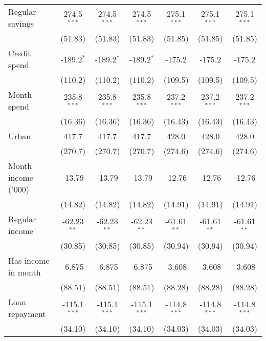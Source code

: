 \begin{table}[htbp]
\begin{footnotesize}
\begin{tabular}{lcccccc}
         Regular savings     & 274.5$^{***}$  & 274.5$^{***}$  & 274.5$^{***}$  & 275.1$^{***}$  & 275.1$^{***}$  & 275.1$^{***}$\\
                             & (51.83)        & (51.83)        & (51.83)        & (51.85)        & (51.85)        & (51.85)\\
         Credit spend        & -189.2$^{*}$   & -189.2$^{*}$   & -189.2$^{*}$   & -175.2         & -175.2         & -175.2\\
                             & (110.2)        & (110.2)        & (110.2)        & (109.5)        & (109.5)        & (109.5)\\
         Month spend         & 235.8$^{***}$  & 235.8$^{***}$  & 235.8$^{***}$  & 237.2$^{***}$  & 237.2$^{***}$  & 237.2$^{***}$\\
                             & (16.36)        & (16.36)        & (16.36)        & (16.43)        & (16.43)        & (16.43)\\
         Urban               & 417.7          & 417.7          & 417.7          & 428.0          & 428.0          & 428.0\\
                             & (270.7)        & (270.7)        & (270.7)        & (274.6)        & (274.6)        & (274.6)\\
         Month income ('000) & -13.79         & -13.79         & -13.79         & -12.76         & -12.76         & -12.76\\
                             & (14.82)        & (14.82)        & (14.82)        & (14.91)        & (14.91)        & (14.91)\\
         Regular income      & -62.23$^{**}$  & -62.23$^{**}$  & -62.23$^{**}$  & -61.61$^{**}$  & -61.61$^{**}$  & -61.61$^{**}$\\
                             & (30.85)        & (30.85)        & (30.85)        & (30.94)        & (30.94)        & (30.94)\\
         Has income in month & -6.875         & -6.875         & -6.875         & -3.608         & -3.608         & -3.608\\
                             & (88.51)        & (88.51)        & (88.51)        & (88.28)        & (88.28)        & (88.28)\\
         Loan repayment      & -115.1$^{***}$ & -115.1$^{***}$ & -115.1$^{***}$ & -114.8$^{***}$ & -114.8$^{***}$ & -114.8$^{***}$\\
                             & (34.10)        & (34.10)        & (34.10)        & (34.03)        & (34.03)        & (34.03)\\

\end{tabular}
\end{footnotesize}
\end{table}
